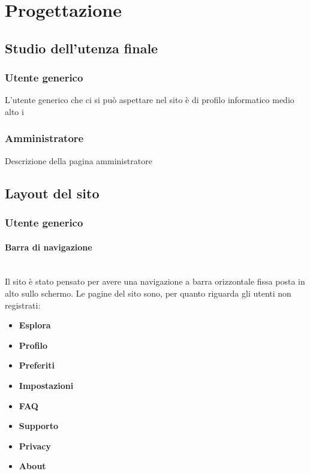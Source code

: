 \newpage
\section{Progettazione}
\subsection{Studio dell'utenza finale}
\subsubsection{Utente generico}
L'utente generico che ci si può aspettare nel sito è di profilo informatico medio alto i


\subsubsection{Amministratore}
Descrizione della pagina amministratore 

\subsection{Layout del sito}

\subsubsection{Utente generico}

\paragraph{Barra di navigazione}
~\\Il sito è stato pensato per avere una navigazione a barra orizzontale fissa posta in alto sullo schermo. Le pagine del sito sono, per quanto riguarda gli utenti non registrati:
\begin{itemize}
	\item \textbf{Esplora}
	\item \textbf{Profilo}
	\item \textbf{Preferiti}
	\item \textbf{Impostazioni}
	\item \textbf{FAQ}
	\item \textbf{Supporto}	
	\item \textbf{Privacy}
	\item \textbf{About}
\end{itemize}

